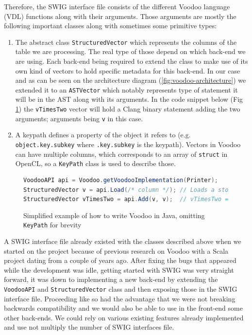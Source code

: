 Therefore, the SWIG interface file consists of the different Voodoo language (VDL) functions along with their arguments. Those arguments are mostly the following important classes along with sometimes some primitive types:

\begin{enumerate}
    \item The abstract class \texttt{StructuredVector} which represents the columns of the table we are processing. The real type of those depend on which back-end we are using. Each back-end being required to extend the class to make use of its own kind of vectors to hold specific metadata for this back-end. In our case and as can be seen on the architecture diagram (\ref{fig:voodoo-architecture}) we extended it to an \texttt{ASTVector} which notably represents type of statement it will be in the AST along with its arguments. In the code snippet below (Fig \ref{fig:java-voodoo-api}) the \texttt{vTimesTwo} vector will hold a Clang binary statement adding the two arguments; arguments being \texttt{v} in this case.
    
    \item A keypath defines a property of the object it refers to (e.g. \texttt{object.key.subkey} where \texttt{.key.subkey} is the keypath). Vectors in Voodoo can have multiple columns, which corresponds to an array of \texttt{struct} in OpenCL, so a \texttt{KeyPath} class is used to describe those.
\end{enumerate}

\begin{figure}[h]
    \centering
\begin{lstlisting}[frame=single, language=Java]  
VoodooAPI api = Voodoo.getVoodooImplementation(Printer);
StructuredVector v = api.Load(/* column */); // Loads a stored column of a table
StructuredVector vTimesTwo = api.Add(v, v);  // vTimesTwo = 2 * v
\end{lstlisting}
    \caption{Simplified example of how to write Voodoo in Java, omitting \texttt{KeyPath} for brevity}
    \label{fig:java-voodoo-api}
\end{figure}

A SWIG interface file already existed with the classes described above when we started on the project because of previous research on Voodoo with a Scala project dating from a couple of years ago. After fixing the bugs that appeared while the development was idle, getting started with SWIG was very straight forward, it was down to implementing a new back-end by extending the \texttt{VoodooAPI} and \texttt{StructuredVector} class and then exposing those in the SWIG interface file. Proceeding like so had the advantage that we were not breaking backwards compatibility and we would also be able to use in the front-end some other back-ends. We could rely on various existing features already implemented and use not multiply the number of SWIG interfaces file.

